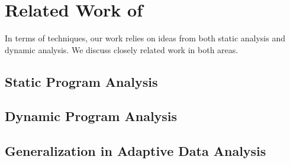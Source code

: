 \chapter{Related Work of {\ADAPTSYSTEM}}
\label{ch:adapt-relatedwork}

In terms of techniques, our work relies on ideas from both static analysis and dynamic analysis. 
We discuss closely related work in both areas.

\section{Static Program Analysis} 
\label{sec:adapt-rw-static}

\section{Dynamic Program Analysis}
\label{sec:adapt-rw-dynamic}


\section{Generalization in Adaptive Data Analysis}
\label{sec:adapt-rw-ge}


